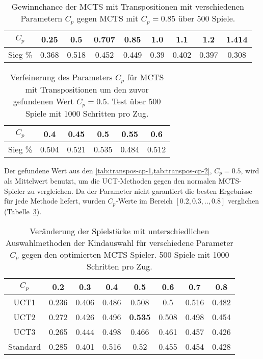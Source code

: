 \begin{table}[h!]
	\centering
	\begin{tabular}{|c||c|c|c|c|c|c|c|c|}
		\hline
		$C_p$ & 0.25 & 0.5 & 0.707 & 0.85 & 1.0 & 1.1 & 1.2 & 1.414 \\
		\hline
		Sieg \% & 0.368 & 0.518 & 0.452 & 0.449 & 0.39 & 0.402 & 0.397 & 0.308 \\
		\hline
	\end{tabular}
	\caption{Gewinnchance der MCTS mit Transpositionen mit verschiedenen Parametern $C_p$ gegen MCTS mit $C_p=0.85$ über 500 Spiele.}
	\label{tab:transpos-cp-1}
\end{table}
\begin{table}[h!]
	\centering
	\begin{tabular}{|c||c|c|c|c|c|}
		\hline
		$C_p$ & 0.4 & 0.45 & 0.5 & 0.55 & 0.6 \\
		\hline
		Sieg \% & 0.504 & 0.521 & 0.535 & 0.484 & 0.512 \\
		\hline
	\end{tabular}
	\caption{Verfeinerung des Parameters $C_p$ für MCTS mit Transpositionen um den zuvor gefundenen Wert $C_p=0.5$. Test über 500 Spiele mit 1000 Schritten pro Zug.}
	\label{tab:transpos-cp-2}
\end{table}

Der gefundene Wert aus den \cref{tab:transpos-cp-1,tab:transpos-cp-2}, $C_p=0.5$, wird als Mittelwert benutzt, um die UCT-Methoden gegen den normalen MCTS-Spieler zu vergleichen.
Da der Parameter nicht garantiert die besten Ergebnisse für jede Methode liefert, wurden $C_p$-Werte im Bereich $\left[0.2,0.3, .., 0.8\right]$ verglichen (Tabelle~\ref{tab:transpos-methods}).

\medskip


\begin{table}[h!]
	\centering
	\begin{tabular}{|c||c|c|c|c|c|c|c|}
		\hline
		$C_p$ & 0.2 & 0.3 & 0.4 & 0.5 & 0.6 & 0.7 & 0.8 \\
		\hline
		UCT1 & 0.236 & 0.406 & 0.486 & 0.508 & 0.5 & 0.516 & 0.482 \\
		\hline
		UCT2 & 0.272 & 0.426 & 0.496 & \textbf{0.535} & 0.508 & 0.498 & 0.454 \\
		\hline
		UCT3 & 0.265 & 0.444 & 0.498 & 0.466 & 0.461 & 0.457 & 0.426 \\
		\hline
		Standard & 0.285 & 0.401 & 0.516 & 0.52 & 0.455 & 0.454 & 0.428 \\
		\hline
	\end{tabular}
	\caption{Veränderung der Spielstärke mit unterschiedlichen Auswahlmethoden der Kindauswahl für verschiedene Parameter $C_p$ gegen den optimierten MCTS Spieler. 500 Spiele mit 1000 Schritten pro Zug.}
	\label{tab:transpos-methods}
\end{table}

